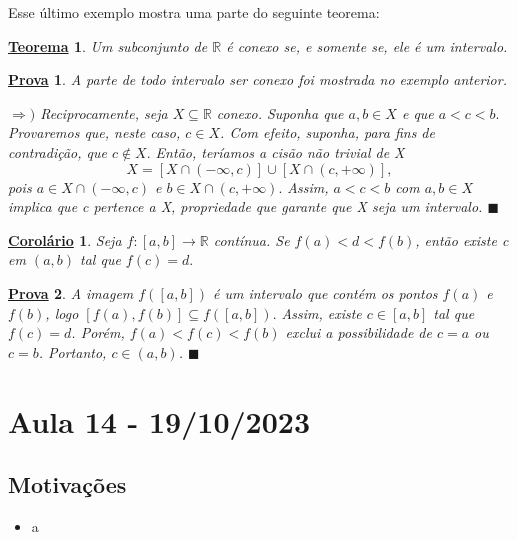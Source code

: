 \documentclass{article}
\newtheorem*{theorem*}{\underline{Teorema}}
\newtheorem*{crl*}{\underline{Corolário}}
\newtheorem*{proof*}{\underline{Prova}}
\renewcommand\qedsymbol{$\blacksquare$}
\begin{document}
Esse último exemplo mostra uma parte do seguinte teorema:
 \begin{theorem*}
    Um subconjunto de \(\mathbb{R}\) é conexo se, e somente se, ele é um intervalo. 
 \end{theorem*}
 \begin{proof*}
   A parte de todo intervalo ser conexo foi mostrada no exemplo anterior.

   \(\Rightarrow )\) Reciprocamente, seja \(X\subseteq{\mathbb{R}}\) conexo. Suponha que \(a, b\in X\) e que
  \(a < c < b.\) Provaremos que, neste caso, \(c\in X\). Com efeito, suponha, para fins de contradição, que
  \(c\not\in X.\) Então, teríamos a cisão não trivial de X
    \[
      X = [X\cap(-\infty, c)]\cup[X\cap(c, +\infty)],
    \]
    pois \(a\in X\cap(-\infty, c)\) e \(b\in X\cap(c, +\infty).\) Assim, \(a < c < b\) com \(a, b\in X\) implica que c pertence a X, propriedade que
garante que X seja um intervalo. \qedsymbol
 \end{proof*}
 \hypertarget{intermediate_value}{\begin{crl*}
     Seja \(f:[a, b]\rightarrow \mathbb{R}\) contínua. Se \(f(a) < d < f(b)\), então existe c em \((a, b)\) tal que \(f(c) = d.\)  
 \end{crl*}}
 \begin{proof*}
   A imagem \(f([a, b])\) é um intervalo que contém os pontos \(f(a)\) e \(f(b)\), logo \([f(a), f(b)]\subseteq{f([a, b])}.\) Assim,
existe \(c\in[a, b]\) tal que \(f(c) = d\). Porém, \(f(a) < f(c) < f(b)\) exclui a possibilidade de \(c = a\) ou \(c = b\). Portanto,
 \(c\in (a, b)\). \qedsymbol
 \end{proof*}
\newpage

\section{Aula 14 - 19/10/2023}
\subsection{Motivações} 
\begin{itemize}
  \item a
\end{itemize}
\end{document}
